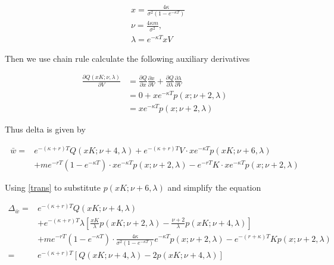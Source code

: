 \begin{equation}
    \begin{aligned}
        &x=\frac{4 \kappa}{\sigma^{2}(1-e^{-\kappa T})} \\
        &\nu=\frac{4 \kappa m}{\sigma^{2}}, \\
        &\lambda= e^{-\kappa T}x V
    \end{aligned}
\end{equation}

\noindent Then we use chain rule calculate the following auxiliary derivatives

\begin{equation}
    \begin{aligned}
        \frac{\partial Q(xK; \nu, \lambda)}{\partial V}&= \frac{\partial Q}{\partial x}\frac{\partial x}{\partial V} + \frac{\partial Q}{\partial \lambda} \frac{\partial \lambda}{\partial V} \\
        &=0 + x e^{-\kappa T} p(x ; \nu+2, \lambda)\\
        &= x e^{-\kappa T} p(x ; \nu+2, \lambda)
    \end{aligned}
\end{equation}

\noindent Thus delta is given by

\begin{equation}
    \begin{aligned}
        \bar{w}=&  e^{ -(\kappa+r) T} Q(x K ; \nu+4, \lambda) + e^{ -(\kappa+r) T}V \cdot x e^{-\kappa T} p(x K ; \nu+6, \lambda)\\
        &+ m e^{-r T}(1-e^{-\kappa T}) \cdot x e^{-\kappa T} p(x ; \nu+2, \lambda) -e^{-r T} K \cdot x e^{-\kappa T} p(x ; \nu+2, \lambda)
        \end{aligned}
\end{equation}

\noindent Using \eqref{trans} to substitute $p(xK;\nu+6,\lambda)$ and simplify the equation

\begin{equation}
    \begin{aligned}
        \Delta_{\bar{w}}=&  e^{ -(\kappa+r) T} Q(x K ; \nu+4, \lambda) \\
        &+ e^{ -(\kappa+r) T} \lambda \left[\frac{xK}{\lambda} p(xK ; \nu+2, \lambda)-\frac{\nu+2}{\lambda} p(xK ; \nu+4, \lambda)\right]\\
        &+ m e^{-r T}(1-e^{-\kappa T}) \cdot \frac{4 \kappa}{\sigma^{2}(1-e^{-\kappa T})} e^{-\kappa T} p(x ; \nu+2, \lambda) -e^{-(r+\kappa) T} K  p(x ; \nu+2, \lambda) \\
        =& e^{ -(\kappa+r) T} [Q(x K ; \nu+4, \lambda)-2p(x K ; \nu+4, \lambda)] 
        \end{aligned}
\end{equation}

